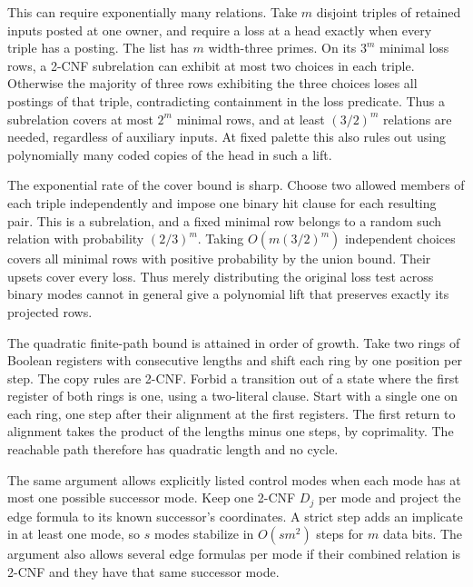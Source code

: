 This can require exponentially many relations.
Take $m$ disjoint triples of retained inputs
posted at one owner, and require a loss at a
head exactly when every triple has a posting.
The list has $m$ width-three primes. On its
$3^m$ minimal loss rows, a 2-CNF subrelation
can exhibit at most two choices in each triple.
Otherwise the majority of three rows exhibiting
the three choices loses all postings of that
triple, contradicting containment in the loss
predicate. Thus a subrelation covers at most
$2^m$ minimal rows, and at least $(3/2)^m$
relations are needed, regardless of auxiliary
inputs. At fixed palette this also rules out
using polynomially many coded copies of the
head in such a lift.

The exponential rate of the cover bound is
sharp. Choose two allowed members of each
triple independently and impose one binary
hit clause for each resulting pair. This is
a subrelation, and a fixed minimal row belongs
to a random such relation with probability
$(2/3)^m$. Taking $O(m(3/2)^m)$ independent
choices covers all minimal rows with positive
probability by the union bound. Their upsets
cover every loss. Thus merely distributing
the original loss test across binary modes
cannot in general give a polynomial lift
that preserves exactly its projected rows.

The quadratic finite-path bound is attained in order of growth.
Take two rings of Boolean registers with consecutive lengths
and shift each ring by one position per step. The copy rules
are 2-CNF. Forbid a transition out of a state where the first
register of both rings is one, using a two-literal clause.
Start with a single one on each ring, one step after their
alignment at the first registers. The first return to alignment
takes the product of the lengths minus one steps, by coprimality.
The reachable path therefore has quadratic length and no cycle.

The same argument allows explicitly listed control modes when
each mode has at most one possible successor mode. Keep one
2-CNF $D_j$ per mode and project the edge formula to its known
successor's coordinates. A strict step adds an implicate in
at least one mode, so $s$ modes stabilize in $O(sm^2)$ steps
for $m$ data bits. The argument also allows several edge
formulas per mode if their combined relation is 2-CNF and
they have that same successor mode.

